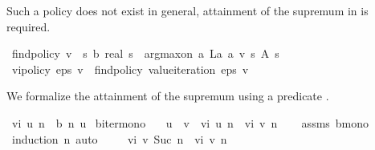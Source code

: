 \begin{isabellebody}
\begin{isamarkuptext}
Such a policy does not exist in general, attainment of the supremum in  is required.%
\end{isamarkuptext}\isamarkuptrue%
\isamarkupfalse%
\ {\isachardoublequoteopen}find{\isacharunderscore}{\kern0pt}policy\ {\isacharparenleft}{\kern0pt}v\ {\isacharcolon}{\kern0pt}{\isacharcolon}{\kern0pt}\ {\isacharprime}{\kern0pt}s\ {\isasymRightarrow}\isactrlsub b\ real{\isacharparenright}{\kern0pt}\ s\ {\isacharequal}{\kern0pt}\ arg{\isacharunderscore}{\kern0pt}max{\isacharunderscore}{\kern0pt}on\ {\isacharparenleft}{\kern0pt}{\isasymlambda}a{\isachardot}{\kern0pt}\ L\isactrlsub a\ a\ v\ s{\isacharparenright}{\kern0pt}\ {\isacharparenleft}{\kern0pt}A\ s{\isacharparenright}{\kern0pt}{\isachardoublequoteclose}\isanewline
\isanewline
{}\isamarkupfalse%
\ {\isachardoublequoteopen}vi{\isacharunderscore}{\kern0pt}policy\ eps\ v\ {\isacharequal}{\kern0pt}\ find{\isacharunderscore}{\kern0pt}policy\ {\isacharparenleft}{\kern0pt}value{\isacharunderscore}{\kern0pt}iteration\ eps\ v{\isacharparenright}{\kern0pt}{\isachardoublequoteclose}%
\begin{isamarkuptext}%
We formalize the attainment of the supremum using a predicate .%
\end{isamarkuptext}\isamarkuptrue%
\isamarkupfalse%
\ {\isachardoublequoteopen}vi\ u\ n\ {\isasymequiv}\ {\isacharparenleft}{\kern0pt}{\isasymL}\isactrlsub b\ {\isacharcircum}{\kern0pt}{\isacharcircum}{\kern0pt}n{\isacharparenright}{\kern0pt}\ u{\isachardoublequoteclose}\isanewline
\isanewline
{}\isamarkupfalse%
\ {\isasymL}\isactrlsub b{\isacharunderscore}{\kern0pt}iter{\isacharunderscore}{\kern0pt}mono{\isacharcolon}{\kern0pt}\isanewline
\ \ \ {\isachardoublequoteopen}u\ {\isasymle}\ v{\isachardoublequoteclose}\ \ {\isachardoublequoteopen}vi\ u\ n\ {\isasymle}\ vi\ v\ n{\isachardoublequoteclose}\isanewline
%
\isadelimproof
\ \ %
\endisadelimproof
%
\isatagproof
{}\isamarkupfalse%
\ assms\ {\isasymL}\isactrlsub b{\isacharunderscore}{\kern0pt}mono\ \isanewline
\ \ \isamarkupfalse%
\ {\isacharparenleft}{\kern0pt}induction\ n{\isacharparenright}{\kern0pt}\ auto%
\endisatagproof
{\isafoldproof}%
%
\isadelimproof
\isanewline
%
\endisadelimproof
\isanewline
{}\isamarkupfalse%
\ \isanewline
\ \ \ {\isachardoublequoteopen}vi\ v\ {\isacharparenleft}{\kern0pt}Suc\ n{\isacharparenright}{\kern0pt}\ {\isasymle}\ vi\ v\ n{\isachardoublequoteclose}\ \isanewline

\end{isabellebody}
